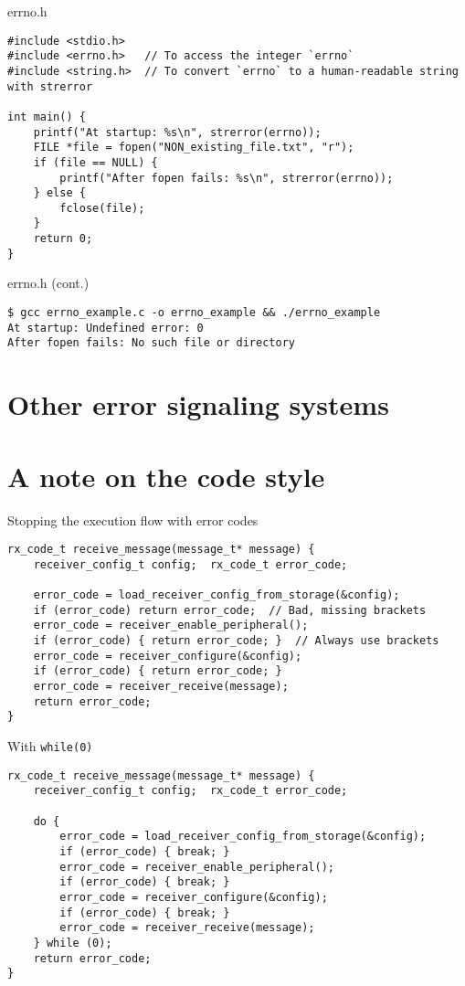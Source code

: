 \documentclass[aspectratio=169,14pt]{beamer}
\begin{document}
\begin{frame}[fragile]{errno.h}
\begin{lstlisting}[style=cstyle]
#include <stdio.h>
#include <errno.h>   // To access the integer `errno`
#include <string.h>  // To convert `errno` to a human-readable string with strerror

int main() {
    printf("At startup: %s\n", strerror(errno));
    FILE *file = fopen("NON_existing_file.txt", "r");
    if (file == NULL) {
        printf("After fopen fails: %s\n", strerror(errno));
    } else {
        fclose(file);
    }
    return 0;
}
\end{lstlisting}
\end{frame}

\begin{frame}[fragile]{errno.h (cont.)}
\begin{lstlisting}[style=nostyle]
$ gcc errno_example.c -o errno_example && ./errno_example
At startup: Undefined error: 0
After fopen fails: No such file or directory
\end{lstlisting}
\end{frame}


\section{Other error signaling systems}


\section{A note on the code style}

\begin{frame}[fragile]{Stopping the execution flow with error codes}
\begin{lstlisting}[style=cstyle]
rx_code_t receive_message(message_t* message) {
    receiver_config_t config;  rx_code_t error_code;
    
    error_code = load_receiver_config_from_storage(&config);
    if (error_code) return error_code;  // Bad, missing brackets
    error_code = receiver_enable_peripheral();
    if (error_code) { return error_code; }  // Always use brackets
    error_code = receiver_configure(&config);
    if (error_code) { return error_code; }
    error_code = receiver_receive(message);
    return error_code;
}
\end{lstlisting}
\end{frame}

\begin{frame}[fragile]{With \texttt{while(0)}}
\begin{lstlisting}[style=cstyle]
rx_code_t receive_message(message_t* message) {
    receiver_config_t config;  rx_code_t error_code;
    
    do {
        error_code = load_receiver_config_from_storage(&config);
        if (error_code) { break; }
        error_code = receiver_enable_peripheral();
        if (error_code) { break; }
        error_code = receiver_configure(&config);
        if (error_code) { break; }
        error_code = receiver_receive(message);
    } while (0);
    return error_code;
}
\end{lstlisting}
\end{frame}
\end{document}
